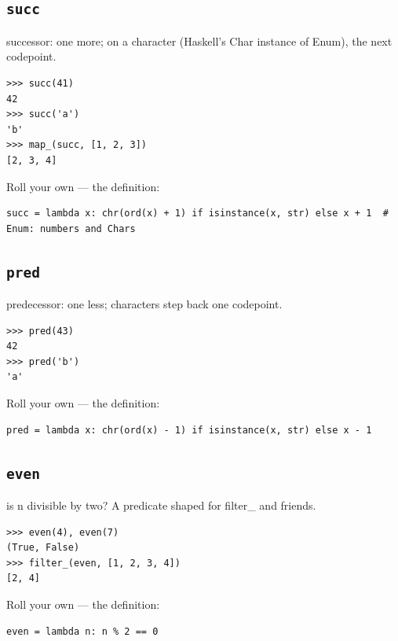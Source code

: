 \documentclass[10pt,letterpaper]{book}
\begin{document}
\subsection{\texttt{succ}}\label{def:succ}
successor: one more; on a character (Haskell's Char instance of Enum), the next codepoint.
\begin{lstlisting}[style=ex]
>>> succ(41)
42
>>> succ('a')
'b'
>>> map_(succ, [1, 2, 3])
[2, 3, 4]
\end{lstlisting}

Roll your own --- the definition:

\begin{lstlisting}[style=ex]
succ = lambda x: chr(ord(x) + 1) if isinstance(x, str) else x + 1  # Enum: numbers and Chars
\end{lstlisting}

\subsection{\texttt{pred}}\label{def:pred}
predecessor: one less; characters step back one codepoint.
\begin{lstlisting}[style=ex]
>>> pred(43)
42
>>> pred('b')
'a'
\end{lstlisting}

Roll your own --- the definition:

\begin{lstlisting}[style=ex]
pred = lambda x: chr(ord(x) - 1) if isinstance(x, str) else x - 1
\end{lstlisting}
\subsection{\texttt{even}}\label{def:even}
is n divisible by two? A predicate shaped for filter\_ and friends.
\begin{lstlisting}[style=ex]
>>> even(4), even(7)
(True, False)
>>> filter_(even, [1, 2, 3, 4])
[2, 4]
\end{lstlisting}

Roll your own --- the definition:

\begin{lstlisting}[style=ex]
even = lambda n: n % 2 == 0
\end{lstlisting}
\end{document}
